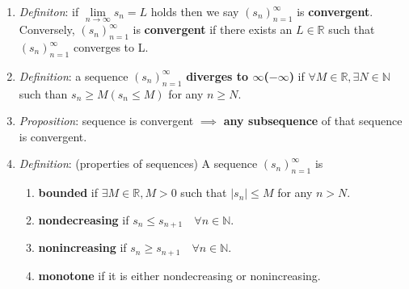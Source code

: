 \documentclass[10pt]{article}
\newcommand{\seqn}[1]{(#1)^\infty_{n=1}}
\newcommand{\real}{\mathbb{R}}
\newcommand{\nat}{\mathbb{N}}
\begin{document}
\begin{multicols*}{3}
\begin{enumerate}
		\item \emph{Definiton}: if $\lim\limits_{n\to\infty}s_n=L$
		      holds then we say $\seqn{s_n}$ is \textbf{convergent}. Conversely,
		      $\seqn{s_n}$ is \textbf{convergent} if
		      there exists an $L\in\real$ such that $\seqn{s_n}$ converges to L.
		\item \emph{Definition}: a sequence $\seqn{s_n}$ \textbf{diverges to
			      $\infty$($-\infty$)} if $\forall M\in\real,\exists N\in\nat$ such
		      than $s_n\geq M (s_n\leq M)$ for any $n\geq N$.
		\item \emph{Proposition}: sequence is convergent $\implies$ \textbf{any
			      subsequence} of that sequence is convergent.
		\item \emph{Definition}: (properties of sequences) A sequence
		      $\seqn{s_n}$ is
		      \begin{enumerate}
			      \item \textbf{bounded} if $\exists M\in\real,M>0$ such that
			            $|s_n|\leq M$ for any $n>N$.
			      \item \textbf{nondecreasing} if $s_n\leq s_{n+1}\quad\forall
				            n\in\nat$.
			      \item \textbf{nonincreasing} if $s_n\geq s_{n+1}\quad\forall
				            n\in\nat$.
			      \item \textbf{monotone} if it is either nondecreasing or
			            nonincreasing.
		      \end{enumerate}


\end{enumerate}
\end{multicols*}
\end{document}
